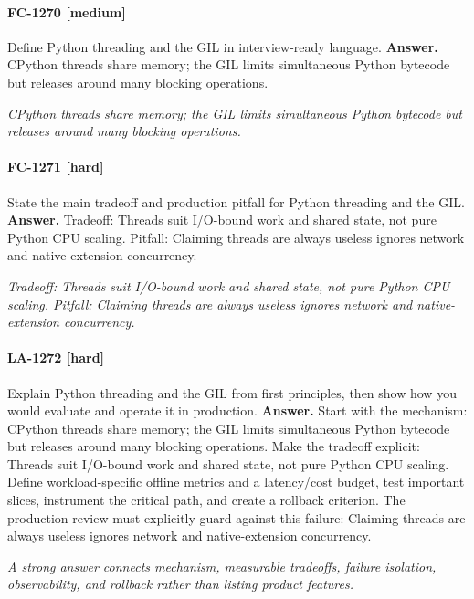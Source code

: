 \paragraph{FC-1270 [medium]} Define Python threading and the GIL in interview-ready language.
\noindent\textbf{Answer.} CPython threads share memory; the GIL limits simultaneous Python bytecode but releases around many blocking operations.
\par\textit{CPython threads share memory; the GIL limits simultaneous Python bytecode but releases around many blocking operations.}
\paragraph{FC-1271 [hard]} State the main tradeoff and production pitfall for Python threading and the GIL.
\noindent\textbf{Answer.} Tradeoff: Threads suit I/O-bound work and shared state, not pure Python CPU scaling. Pitfall: Claiming threads are always useless ignores network and native-extension concurrency.
\par\textit{Tradeoff: Threads suit I/O-bound work and shared state, not pure Python CPU scaling. Pitfall: Claiming threads are always useless ignores network and native-extension concurrency.}
\paragraph{LA-1272 [hard]} Explain Python threading and the GIL from first principles, then show how you would evaluate and operate it in production.
\noindent\textbf{Answer.} Start with the mechanism: CPython threads share memory; the GIL limits simultaneous Python bytecode but releases around many blocking operations. Make the tradeoff explicit: Threads suit I/O-bound work and shared state, not pure Python CPU scaling. Define workload-specific offline metrics and a latency/cost budget, test important slices, instrument the critical path, and create a rollback criterion. The production review must explicitly guard against this failure: Claiming threads are always useless ignores network and native-extension concurrency.
\par\textit{A strong answer connects mechanism, measurable tradeoffs, failure isolation, observability, and rollback rather than listing product features.}
